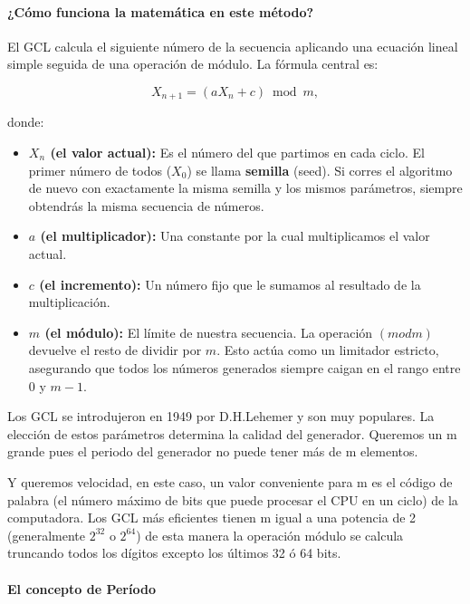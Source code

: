 \documentclass{article}
\begin{document}
\paragraph{¿Cómo funciona la matemática en este método?} El GCL calcula el siguiente número de la secuencia aplicando una ecuación lineal simple seguida de una operación de módulo. La fórmula central es:

\begin{equation}
X_{n+1} = (a X_n + c) \bmod m,
\end{equation}

donde:

\begin{itemize}
  \item \textbf{$X_n$ (el valor actual):} Es el número del que partimos en cada ciclo. El primer número de todos ($X_{0}$) se llama \textbf{semilla} (seed). Si corres el algoritmo de nuevo con exactamente la misma semilla y los mismos parámetros, siempre obtendrás la misma secuencia de números.
  \item \textbf{$a$ (el multiplicador):} Una constante por la cual multiplicamos el valor actual.
  \item \textbf{$c$ (el incremento):} Un número fijo que le sumamos al resultado de la multiplicación.
  \item \textbf{$m$ (el módulo):} El límite de nuestra secuencia. La operación $(mod m)$ devuelve el resto de dividir por $m$. Esto actúa como un limitador estricto, asegurando que todos los números generados siempre caigan en el rango entre 0 y $m-1$.
\end{itemize}

Los GCL se introdujeron en 1949 por D.H.Lehemer y son muy populares. La elección de estos parámetros determina la calidad del generador. Queremos un m grande pues el periodo del generador no puede tener más de m elementos.

Y queremos velocidad, en este caso, un valor conveniente para m es el código de palabra (el número máximo de bits que puede procesar el CPU en un ciclo) de la computadora. Los GCL más eficientes tienen m igual a una potencia de 2 (generalmente $2^{32}$ o $2^{64}$) de esta manera la operación módulo se calcula truncando todos los dígitos excepto los últimos 32 ó 64 bits.

\paragraph{El concepto de Período}
\end{document}
